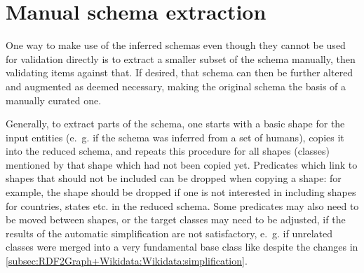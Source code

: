 
\section{Manual schema extraction}
\label{sec:Evaluation:extraction}

One way to make use of the inferred schemas
even though they cannot be used for validation directly
is to extract a smaller subset of the schema manually,
then validating items against that.
If desired, that schema can then be further altered and augmented as deemed necessary,
making the original schema the basis of a manually curated one.

Generally, to extract parts of the schema,
one starts with a basic shape for the input entities
(e.~g.  if the schema was inferred from a set of humans),
copies it into the reduced schema,
and repeats this procedure for all shapes (classes) mentioned by that shape which had not been copied yet.
Predicates which link to shapes that should not be included can be dropped when copying a shape:
for example, the  shape should be dropped
if one is not interested in including shapes for countries, states etc. in the reduced schema.
Some predicates may also need to be moved between shapes,
or the target classes may need to be adjusted,
if the results of the automatic simplification are not satisfactory,
e.~g. if unrelated classes were merged into a very fundamental base class like 
despite the changes in \cref{subsec:RDF2Graph+Wikidata:Wikidata:simplification}.

